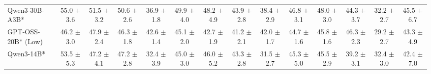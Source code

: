 \begin{table}[t]
{\begin{tabular}{l *{13}{c}}


 
\rowcolor{gray!10}
 Qwen3-30B-A3B* &
55.0 {\tiny$\pm$ 3.6} & 
51.5 {\tiny$\pm$ 3.2} & 
50.6 {\tiny$\pm$ 2.6} & 
36.9 {\tiny$\pm$ 1.8} &
49.9 {\tiny$\pm$ 4.0} & 
48.2 {\tiny$\pm$ 4.9} & 
43.9 {\tiny$\pm$ 2.8} & 
38.4 {\tiny$\pm$ 2.9} &
46.8 {\tiny$\pm$ 3.1} & 
48.0 {\tiny$\pm$ 3.0} & 
44.3 {\tiny$\pm$ 3.7} & 
32.2 {\tiny$\pm$ 2.7} &
45.5 {\tiny$\pm$ 6.7} \\

 

GPT-OSS-20B* (Low)	&
46.2 {\tiny$\pm$ 3.0} &
47.9 {\tiny$\pm$ 2.4} &
46.3 {\tiny$\pm$ 1.8} &
42.6 {\tiny$\pm$ 1.4} &
45.1 {\tiny$\pm$ 2.0} &
42.7 {\tiny$\pm$ 1.9} &
41.2 {\tiny$\pm$ 2.1} &
42.0 {\tiny$\pm$ 1.7} &
44.7 {\tiny$\pm$ 1.6} &
45.8 {\tiny$\pm$ 1.6} &
46.3 {\tiny$\pm$ 2.3} &
29.2 {\tiny$\pm$ 2.7} &
43.3 {\tiny$\pm$ 4.9} \\

	

\rowcolor{gray!10}
 Qwen3-14B* &
53.5 {\tiny$\pm$ 5.3} & 
47.2 {\tiny$\pm$ 4.1} & 
47.2 {\tiny$\pm$ 2.8} & 
32.4 {\tiny$\pm$ 3.9} &
45.0 {\tiny$\pm$ 3.0} & 
46.0 {\tiny$\pm$ 5.2} & 
43.3 {\tiny$\pm$ 2.8} & 
31.5 {\tiny$\pm$ 2.7} &
45.3 {\tiny$\pm$ 5.0} & 
45.5 {\tiny$\pm$ 2.9} & 
39.2 {\tiny$\pm$ 3.1} & 
32.4 {\tiny$\pm$ 3.0} &
42.4 {\tiny$\pm$ 7.0} \\





\end{tabular}}
\end{table}
